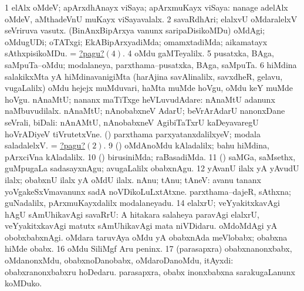 \noindent
\gl{\pagu }
\bmng
\bnum
\num{1}  elAlx oMdeV; apArxdhAnayx viSaya; apArxmuKayx viSaya:  nanage adelAlx oMdeV, aMthadeVnU muKayx viSayavalalx. 
\hypertarget{onepagu2}{} 
\num{2}  savaRdhAri; elalxvU oMdaralelxV seVriruva vasutx. 
  
\banum
{} (BinAnxBipArxya \mo vanunx saripaDisikoMDu) oMdAgi; oMdugUDi; oTATxgi; EkABipArxyadiMda; omamxtadiMda; aikamatayx sAthxpisikoMDu. 
 = \hyperlink{onepagu4}{?pagu?\((4)\)}. 
\hypertarget{onepagu4}{} 
\eanum
\numie
\num{4}  oMdu gaMTeyalilx. 
\num{5}  pusatxka, BAga, saMpuTa--oMdu; modalaneya, parxthama--pusatxka, BAga, saMpuTa. 
\num{6}  hiMdina salakikxMta yA hiMdinavanigiMta (harAjina savAlinalilx, savxdheR, gelavu, \mo vugaLalilx) oMdu hejejx muMduvari, haMta muMde hoVgu, oMdu keY muMde hoVgu. 
  
\banum
{} nAnaMtU; nananx maTiTxge heVLuvudAdare:  nAnaMtU adanunx naMbuvudilalx. 
 nAnaMtU; nAnobabxneV AdarU; beVrArAdarU nanonxDane seVrali, biDali:  nAnAMtU, nAnobabxneV AgibiTaTxrU kaDeyavaregU hoVrADiyeV tiVrutetxVne. 
\eanum
\numie
{}  
\banum
{} (\AmA) parxthama parxyatanxdalilxyeV; modala saladalelxV. 
 = \hyperlink{onepagu2}{?pagu?\((2)\)}. 
\eanum
\numie
\num{9}  (\birx) oMdAnoMdu kAladalilx; bahu hiMdina, pArxciVna kAladalilx. 
\num{10}  (\AmA) birusiniMda; raBasadiMda. 
\num{11}  (\pArxparx) saMGa, saMsethx, guMpugaLa sadasayxnAgu; avugaLalilx obabxnAgu. 
\num{12}  yAvanU ilalx yA yAvudU ilalx; obabxnU ilalx yA oMdU ilalx. 
  
\banum
{} nAnu; tAnu; tAneV:  avanu tananx yoVgakeSxVmavanunx sadA noVDikoLuLxtAtxne. 
 parxthama--dajeR, sAthxna; guNadalilx, pArxmuKayxdalilx modalaneyadu. 
\eanum
\numie
\num{14}  elalxrU; veYyakitxkavAgi hAgU sAmUhikavAgi savaRrU:  A hitakara salaheya paravAgi elalxrU, veYyakitxkavAgi matutx sAmUhikavAgi mata niVDidaru. 
\hypertarget{onepagu15}{} 
  
\banum
{} oMdoMdAgi yA obobxbabxnAgi. 
 oMdara taruvAya oMdu yA obabxnAda meVlobabx; obabxna hiMde obabx. 
\eanum
\numie
\num{16}  oMdu SiliMgf Aru peninx. 
\num{17}  (parasapxra) obabxnanonxbabx, oMdanonxMdu, obabxnoDanobabx, oMdaroDanoMdu, itAyxdi:  obabxranonxbabxru hoDedaru.  parasapxra, obabx inonxbabxna sarakugaLanunx koMDuko. 
